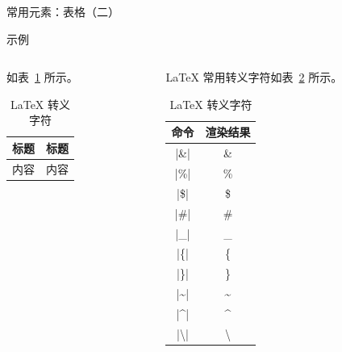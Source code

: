 \begin{frame}[fragile]{常用元素：表格（二）}
  \vspace{-1em}
  \begin{exampleblock}{示例}
    \begin{columns}
      \begin{column}{0.5\textwidth}
        \begin{texcode}[gobble=10,moretexcs={\toprule,\midrule,\bottomrule},emph={[1]table,tabular}, emph={[2]booktabs}]
          \usepackage{booktabs}

          如表~\ref{tab_escape} 所示。
          \begin{table}
            \caption{\LaTeX{} 转义字符}
            \label{tab_escape}
            \begin{tabular}{cc}
              \toprule
              标题 & 标题 \\
              \midrule
              内容 & 内容 \\
              \bottomrule
            \end{tabular}
          \end{table}
        \end{texcode}
      \end{column}

      \begin{column}{0.4\textwidth}
        \scriptsize
        \LaTeX{} 常用转义字符如表~\ref{tab_escape_} 所示。
        \scriptsize
        \begin{table}
          \caption{\LaTeX{} 转义字符}
          \label{tab_escape_}
          \begin{tabular}{cc}
            \toprule
            命令                 & 渲染结果             \\
            \midrule
            |\&|               & \&               \\
            |\%|               & \%               \\
            |\$|               & \$               \\
            |\#|               & \#               \\
            |\_|               & \_               \\
            |\{|               & \{               \\
            |\}|               & \}               \\
            |\textasciitilde|  & \textasciitilde  \\
            |\textasciicircum| & \textasciicircum \\
            |\textbackslash|   & \textbackslash   \\
            \bottomrule
          \end{tabular}
        \end{table}
      \end{column}
    \end{columns}
  \end{exampleblock}


\end{frame}
